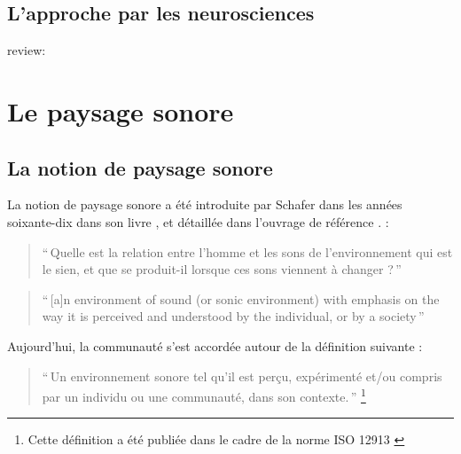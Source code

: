 \subsection{L'approche par les neurosciences}

review: \citep{snyder2007toward}

\section{Le paysage sonore}
\label{sec:paysageSonore}

\subsection{La notion de paysage sonore}

La notion de paysage sonore a été introduite par Schafer dans les années soixante-dix dans son livre \citep{schafer1969new}, et détaillée dans l'ouvrage de référence \citep{schafer1977tuning}.  :

\begin{quote}
``\,Quelle est la relation entre l'homme et les sons de l'environnement qui est le sien, et que se produit-il lorsque ces sons viennent à changer ?\,''
\end{quote}


\begin{quote}
``\,[a]n environment of sound (or sonic environment) with emphasis on the way it is perceived and understood by the individual, or by a society\,'' 
\end{quote}

Aujourd'hui, la communauté s'est accordée  autour de la définition suivante \citep{aletta2016soundscape}:

\begin{quote}
``\,Un environnement sonore tel qu'il est perçu, expérimenté et/ou compris par un individu ou une communauté, dans son contexte.\,'' \footnote{Cette définition a été publiée dans le cadre de la norme ISO 12913 \citep{iso12913}}
\end{quote}

